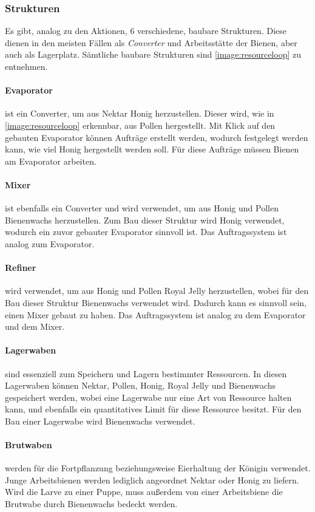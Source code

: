 \subsubsection{Strukturen}
Es gibt, analog zu den Aktionen, 6 verschiedene, baubare Strukturen. Diese dienen in den meisten Fällen als \textit{Converter} und Arbeitsstätte der Bienen, aber auch als Lagerplatz. Sämtliche baubare Strukturen sind \autoref{image:resourceloop} zu entnehmen.

\paragraph{Evaporator} ist ein Converter, um aus Nektar Honig herzustellen. Dieser wird, wie in \autoref{image:resourceloop} erkennbar, aus Pollen hergestellt. Mit Klick auf den gebauten Evaporator können Aufträge erstellt werden, wodurch festgelegt werden kann, wie viel Honig hergestellt werden soll. Für diese Aufträge müssen Bienen am Evaporator arbeiten.

\paragraph{Mixer} ist ebenfalls ein Converter und wird verwendet, um aus Honig und Pollen Bienenwachs herzustellen. Zum Bau dieser Struktur wird Honig verwendet, wodurch ein zuvor gebauter Evaporator sinnvoll ist. Das Auftragssystem ist analog zum Evaporator.

\paragraph{Refiner} wird verwendet, um aus Honig und Pollen Royal Jelly herzustellen, wobei für den Bau dieser Struktur Bienenwachs verwendet wird. Dadurch kann es sinnvoll sein, einen Mixer gebaut zu haben. Das Auftragssystem ist analog zu dem Evaporator und dem Mixer.

\paragraph{Lagerwaben} sind essenziell zum Speichern und Lagern bestimmter Ressourcen. In diesen Lagerwaben können Nektar, Pollen, Honig, Royal Jelly und Bienenwachs gespeichert werden, wobei eine Lagerwabe nur eine Art von Ressource halten kann, und ebenfalls ein quantitatives Limit für diese Ressource besitzt. Für den Bau einer Lagerwabe wird Bienenwachs verwendet.

\paragraph{Brutwaben} werden für die Fortpflanzung beziehungsweise Eierhaltung der Königin verwendet. Junge Arbeitsbienen werden lediglich angeordnet Nektar oder Honig zu liefern. Wird die Larve zu einer Puppe, muss außerdem von einer Arbeitsbiene die Brutwabe durch Bienenwachs bedeckt werden.

